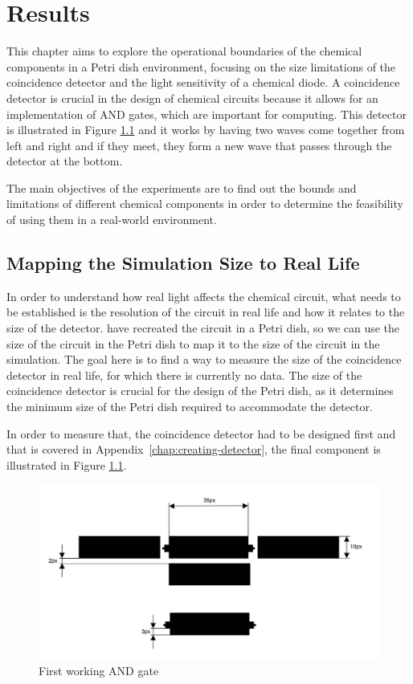 \chapter{Results} \label{ch:results}
This chapter aims to explore the operational boundaries of the chemical components in a Petri dish environment, focusing on the size limitations of the coincidence detector and the light sensitivity of a chemical diode.
A coincidence detector is crucial in the design of chemical circuits because it allows for an implementation of AND gates,
which are important for computing. This detector is illustrated in Figure \ref{fig:and-gate} and it works by having two waves come together from left and right and if they meet, they form a new wave that passes through the detector at the bottom.

The main objectives of the experiments are to find out the bounds and limitations of different chemical components in order to determine the feasibility of using them in a real-world environment.

\section{Mapping the Simulation Size to Real Life} \label{sec:mapping-simulation-to-real-life}
In order to understand how real light affects the chemical circuit, what needs to be established is the resolution of the circuit in real life and how it relates to the size of the detector. \cite{gorecki2003chemical} have recreated the circuit in a Petri dish, so we can use the size of the circuit in the Petri dish to map it to the size of the circuit in the simulation.
The goal here is to find a way to measure the size of the coincidence detector in real life, for which there is currently no data. The size of the coincidence detector is crucial for the design of the Petri dish, as it determines the minimum size of the Petri dish required to accommodate the detector. 

In order to measure that, the coincidence detector had to be designed first and that is covered in Appendix~\ref{chap:creating-detector}, the final component is illustrated in Figure \ref{fig:and-gate}.


\begin{figure}
    \centering
    \includegraphics[width=1\linewidth]{measurement-and.jpg}
    \caption{First working AND gate}
    \label{fig:and-gate}
\end{figure}

